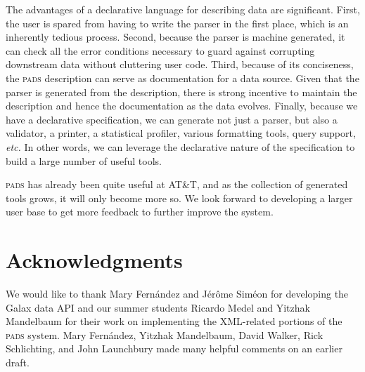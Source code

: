 \documentclass{sigplanconf}
\newcommand{\etc}{{\em etc.\/}}
\newcommand{\pads}{\textsc{pads}}
\begin{document}
The 
advantages of a declarative language for describing data are
significant.  First, the user is spared from having to write
the parser in the first place, which is an inherently tedious
process.   Second, because the parser is machine
generated, it can check all the error conditions necessary to
guard against corrupting downstream data without cluttering
user code.  Third, because of its conciseness, the \pads{}
description can serve as documentation for a data source.  Given
that the parser is generated from the description, there is 
strong incentive to maintain the description and hence the documentation
as the data evolves.  Finally, because we have a declarative
specification, we can generate not just a parser, but also
a validator, a printer, a statistical profiler, various formatting
tools, query support, \etc{}  In other words, we can leverage the declarative nature of the specification to build a large number of useful tools.

\pads{} has already been quite useful at AT\&T, and as the collection of generated tools grows, it will only become more so.  We look forward to developing a larger user base to get more feedback to further improve the system. 


\section{Acknowledgments}
We would like to thank Mary Fern\'andez and J\'er\^ome Sim\'eon for 
developing the Galax data API and our summer
students Ricardo Medel and Yitzhak Mandelbaum for their work on implementing
the XML-related portions of the \pads{} system.
Mary Fern\'andez, Yitzhak Mandelbaum, David Walker, Rick Schlichting,
and John Launchbury made many helpful comments on an earlier draft.
\end{document}
